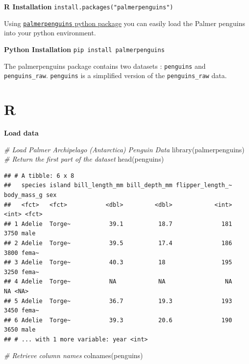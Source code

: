 \documentclass[
]{book}
\newenvironment{Shaded}{\begin{snugshade}}{\end{snugshade}}
\newcommand{\CommentTok}[1]{\textcolor[rgb]{0.56,0.35,0.01}{\textit{#1}}}
\newcommand{\FunctionTok}[1]{\textcolor[rgb]{0.00,0.00,0.00}{#1}}
\newcommand{\NormalTok}[1]{#1}
\begin{document}
\textbf{R Installation}
\texttt{install.packages("palmerpenguins")}

Using \href{https://pypi.org/project/palmerpenguins/}{\texttt{palmerpenguins} python package} you can easily load the Palmer penguins into your python environment.

\textbf{Python Installation}
\texttt{pip\ install\ palmerpenguins}

The palmerpenguins package contains two datasets : \texttt{penguins} and \texttt{penguins\_raw}. \texttt{penguins} is a simplified version of the \texttt{penguins\_raw} data.

\hypertarget{r-5}{%
\section{R}\label{r-5}}

\textbf{Load data}

\begin{Shaded}
\begin{Highlighting}[]
\CommentTok{\# Load Palmer Archipelago (Antarctica) Penguin Data}
\FunctionTok{library}\NormalTok{(palmerpenguins)}
\CommentTok{\# Return the first part of the dataset}
\FunctionTok{head}\NormalTok{(penguins)}
\end{Highlighting}
\end{Shaded}

\begin{verbatim}
## # A tibble: 6 x 8
##   species island bill_length_mm bill_depth_mm flipper_length_~ body_mass_g sex  
##   <fct>   <fct>           <dbl>         <dbl>            <int>       <int> <fct>
## 1 Adelie  Torge~           39.1          18.7              181        3750 male 
## 2 Adelie  Torge~           39.5          17.4              186        3800 fema~
## 3 Adelie  Torge~           40.3          18                195        3250 fema~
## 4 Adelie  Torge~           NA            NA                 NA          NA <NA> 
## 5 Adelie  Torge~           36.7          19.3              193        3450 fema~
## 6 Adelie  Torge~           39.3          20.6              190        3650 male 
## # ... with 1 more variable: year <int>
\end{verbatim}

\begin{Shaded}
\begin{Highlighting}[]
\CommentTok{\# Retrieve column names}
\FunctionTok{colnames}\NormalTok{(penguins)}
\end{Highlighting}
\end{Shaded}
\end{document}

